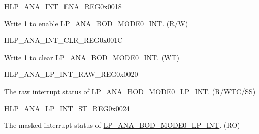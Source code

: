 \begin{register}{H}{LP\_ANA\_INT\_ENA\_REG}{0x0018}\label{regdesc:LPANAINTENAREG}
%
%
\regnewline%
\begin{regdesc}\begin{reglist}
\label{fielddesc:LPANABODMODE0INTENA}\item [LP\_ANA\_BOD\_MODE0\_INT\_ENA] Write 1 to enable \hyperref[int:LPANABODMODE0INT]{LP\_ANA\_BOD\_MODE0\_INT}. (R/W)
\end{reglist}\end{regdesc}
\end{register}

\begin{register}{H}{LP\_ANA\_INT\_CLR\_REG}{0x001C}\label{regdesc:LPANAINTCLRREG}
%
%
\regnewline%
\begin{regdesc}\begin{reglist}
\label{fielddesc:LPANABODMODE0INTCLR}\item [LP\_ANA\_BOD\_MODE0\_INT\_CLR] Write 1 to clear \hyperref[int:LPANABODMODE0INT]{LP\_ANA\_BOD\_MODE0\_INT}. (WT)
\end{reglist}\end{regdesc}
\end{register}

\begin{register}{H}{LP\_ANA\_LP\_INT\_RAW\_REG}{0x0020}\label{regdesc:LPANALPINTRAWREG}
%
%
\regnewline%
\begin{regdesc}\begin{reglist}
\label{fielddesc:LPANABODMODE0LPINTRAW}\item [LP\_ANA\_BOD\_MODE0\_LP\_INT\_RAW] The raw interrupt status of \hyperref[int:LPANABODMODE0LPINT]{LP\_ANA\_BOD\_MODE0\_LP\_INT}. (R/WTC/SS)
\end{reglist}\end{regdesc}
\end{register}

\begin{register}{H}{LP\_ANA\_LP\_INT\_ST\_REG}{0x0024}\label{regdesc:LPANALPINTSTREG}%
%
\regnewline%
\begin{regdesc}\begin{reglist}
\label{fielddesc:LPANABODMODE0LPINTST}\item [LP\_ANA\_BOD\_MODE0\_LP\_INT\_ST] The masked interrupt status of \hyperref[int:LPANABODMODE0LPINT]{LP\_ANA\_BOD\_MODE0\_LP\_INT}. (RO)
\end{reglist}\end{regdesc}
\end{register}

